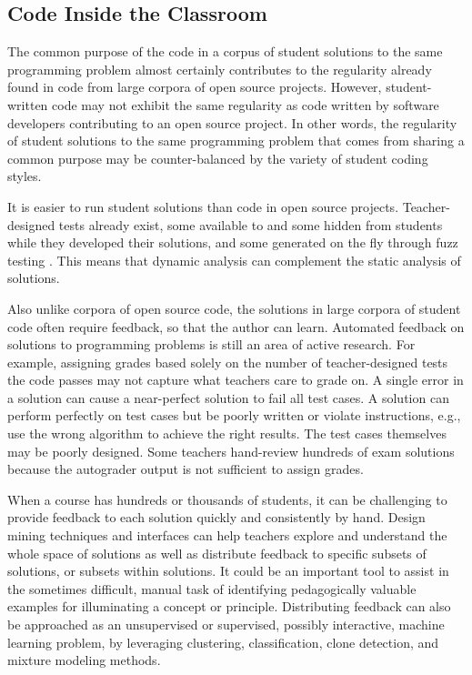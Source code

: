\subsection{Code Inside the Classroom}

The common purpose of the code in a corpus of student solutions to the same programming problem almost certainly contributes to the regularity already found in code from large corpora of open source projects. However, student-written code may not exhibit the same regularity as code written by software developers contributing to an open source project. In other words, the regularity of student solutions to the same programming problem that comes from sharing a common purpose may be counter-balanced by the variety of student coding styles. 

It is easier to run student solutions than code in open source projects. Teacher-designed tests already exist, some available to and some hidden from students while they developed their solutions, and some generated on the fly through fuzz testing \cite{fuzztesting}. This means that dynamic analysis can complement the static analysis of solutions. %

Also unlike corpora of open source code, the solutions in large corpora of student code often require feedback, so that the author can learn. Automated feedback on solutions to programming problems is still an area of active research. For example, assigning grades based solely on the number of teacher-designed tests the code passes may not capture what teachers care to grade on. A single error in a solution can cause a near-perfect solution to fail all test cases. A solution can perform perfectly on test cases but be poorly written or violate instructions, e.g., use the wrong algorithm to achieve the right results. The test cases themselves may be poorly designed. Some teachers hand-review hundreds of exam solutions because the autograder output is not sufficient to assign grades. %

When a course has hundreds or thousands of students, it can be challenging to provide feedback to each solution quickly and consistently by hand. Design mining techniques and interfaces can help teachers explore and understand the whole space of solutions as well as distribute feedback to specific subsets of solutions, or subsets within solutions. It could be an important tool to assist in the sometimes difficult, manual task of identifying pedagogically valuable examples for illuminating a concept or principle. Distributing feedback can also be approached as an unsupervised or supervised, possibly interactive, machine learning problem, by leveraging clustering, classification, clone detection, and mixture modeling methods. %

